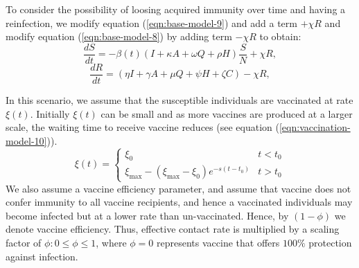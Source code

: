\documentclass[10pt]{wlscirep}
\begin{document}
To consider the possibility of loosing acquired immunity over time and having a reinfection, we modify  equation (\ref{eqn:base-model-9}) and add a term $+\chi R$ and modify equation (\ref{eqn:base-model-8}) by adding term $-\chi R$ to obtain:
%
%
\begin{equation}
\frac{dS}{dt} = -\beta(t) \left( I + \kappa A + \omega Q + \rho H \right) \frac{S}{N} +\chi R,
\label{eqn:loss_immunity-model-8}
\end{equation}
%
%
\begin{equation}
\frac{dR}{dt} =  \left( \eta I +  \gamma A + \mu Q + \psi H + \zeta C \right) -\chi R,
\label{eqn:loss_immunity-model-9}
\end{equation}
%

In this scenario, we assume that the susceptible individuals are vaccinated at rate $\xi(t)$. Initially $\xi(t)$ can be small and as more vaccines are produced at a larger scale, the waiting time to receive vaccine reduces (see equation (\ref{eqn:vaccination-model-10})). 
%
%
\begin{equation}
 \xi(t) = 
\begin{cases}
\xi_0 & t < t_0 \\
\xi_{\max} - (\xi_{\max} - \xi_0) e^{-s \left( t-t_0\right) } & t > t_0
\end{cases}
\label{eqn:vaccination-model-10}
\end{equation}
%
%
We also assume a vaccine efficiency parameter, and assume that vaccine does not confer immunity to all vaccine recipients, and hence a vaccinated individuals may become infected but at a lower rate than un-vaccinated. Hence, by $(1-\phi)$ we denote vaccine efficiency. Thus, effective contact rate is multiplied by a scaling factor of $\phi : 0 \leq \phi \leq 1$, where $\phi = 0$ represents vaccine that offers $100\%$ protection against infection.
\end{document}
